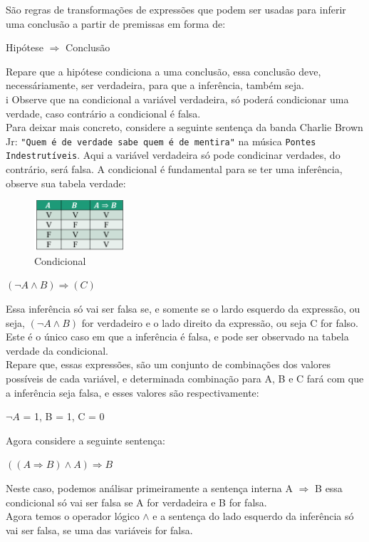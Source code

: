 \documentclass[12pt, onecolumn]{article}
\begin{document}
	São regras de transformações de expressões que podem ser usadas
	para inferir uma conclusão a partir de premissas em forma de: 
	\begin{center}
		Hipótese $\Rightarrow$ Conclusão
	\end{center}
	Repare que a hipótese condiciona a uma conclusão, essa conclusão deve, 
	necessáriamente, ser verdadeira, para que a inferência, também seja. \\i
	Observe que na condicional a variável verdadeira, só poderá condicionar
	uma verdade, caso contrário a condicional é falsa. \\
	\newline
	Para deixar mais concreto, considere a seguinte sentença da banda 
	Charlie Brown Jr: \texttt{"Quem é de verdade sabe quem é de mentira"}
	na música \texttt{Pontes Indestrutíveis}. Aqui a variável verdadeira só
	pode condicinar verdades, do contrário, será falsa. 
	\newline
	A condicional é fundamental para se ter uma inferência, observe sua 
	tabela verdade:
	\begin{figure}[h]
		\centering
		\includegraphics[width=0.3\textwidth]{./imagens/implicacao.png}
		\caption{Condicional}
		\label{fig:condicional}
	\end{figure}

	\begin{center}
		$(\lnot{A} \land B) \Rightarrow  (C)$
	\end{center}
	Essa inferência só vai ser falsa se, e somente se o lardo esquerdo da expressão,
	ou seja, $(\lnot{A} \land B)$ for verdadeiro e o lado direito da expressão, ou 
	seja C for falso. Este é o único caso em que a inferência é falsa, e pode 
	ser observado na tabela verdade da condicional. \\
	\newline
	Repare que, essas expressões, são um conjunto de combinações dos valores
	possíveis de cada variável, e determinada combinação para A, B e C fará com que
	a inferência seja falsa, e esses valores são respectivamente:
	\begin{center}
		$\lnot{A}$ = 1, B =  1, C = 0
	\end{center}
	Agora considere a seguinte sentença: 
	\begin{center}
		$((A \Rightarrow B) \land A) \Rightarrow B$
	\end{center}
	Neste caso, podemos análisar primeiramente a sentença interna 
	A $\Rightarrow$ B essa condicional só vai ser falsa se A for 
	verdadeira e B for falsa. \\
	\newline
	Agora temos o operador lógico $\land$ e a sentença do lado esquerdo da 
	inferência só vai ser falsa, se uma das variáveis for falsa. \\
\end{document}
